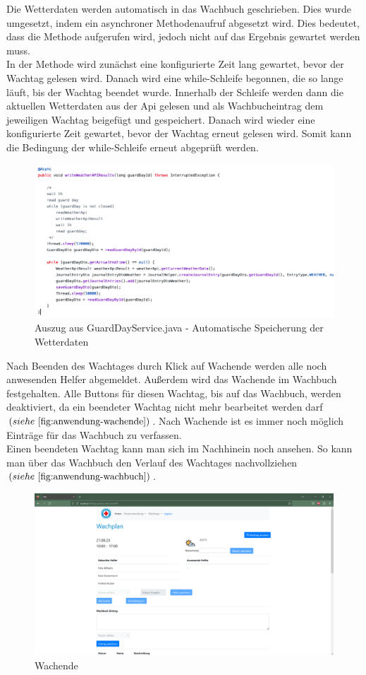 \documentclass[fontsize=12pt,openright,oneside,paper=a4,BCOR=1cm]{scrbook}
\begin{document}
Die Wetterdaten werden automatisch in das Wachbuch geschrieben. Dies wurde umgesetzt, indem ein asynchroner Methodenaufruf abgesetzt wird. Dies bedeutet, dass die Methode aufgerufen wird, jedoch nicht auf das Ergebnis gewartet werden muss. \\
In der Methode wird zun\"achst eine konfigurierte Zeit lang gewartet, bevor der Wachtag gelesen wird. Danach wird eine while-Schleife begonnen, die so lange l\"auft, bis der Wachtag beendet wurde. Innerhalb der Schleife werden dann die aktuellen Wetterdaten aus der Api gelesen und als Wachbucheintrag dem jeweiligen Wachtag beigef\"ugt und gespeichert. Danach wird wieder eine konfigurierte Zeit gewartet, bevor der Wachtag erneut gelesen wird. Somit kann die Bedingung der while-Schleife erneut abgepr\"uft werden. 

\begin{figure}[H]
  \centering
    \includegraphics[width=0.7\linewidth]{Anlagen/Code/weatherApiAsync.png}
    \caption{Auszug aus GuardDayService.java - Automatische Speicherung der Wetterdaten}
  \label{fig:code-weatherapi}
\end{figure}
 
Nach Beenden des Wachtages durch Klick auf \glqq Wachende\grqq{} werden alle noch anwesenden Helfer abgemeldet. Au{\ss}erdem wird das Wachende im Wachbuch festgehalten. Alle Buttons f\"ur diesen Wachtag, bis auf das Wachbuch, werden deaktiviert, da ein beendeter Wachtag nicht mehr bearbeitet werden darf $(siehe~\ref{fig:anwendung-wachende})$. Nach Wachende ist es immer noch möglich Einträge für das Wachbuch zu verfassen.\\
Einen beendeten Wachtag kann man sich im Nachhinein noch ansehen. So kann man \"uber das Wachbuch den Verlauf des Wachtages nachvollziehen $(siehe~\ref{fig:anwendung-wachbuch})$.

\begin{figure}[H]
  \centering
    \includegraphics[width=0.7\linewidth]{Anlagen/Anwendung/8-5WachtagWachende.png}
    \caption{Wachende}
  \label{fig:anwendung-wachende}
\end{figure}
\end{document}
